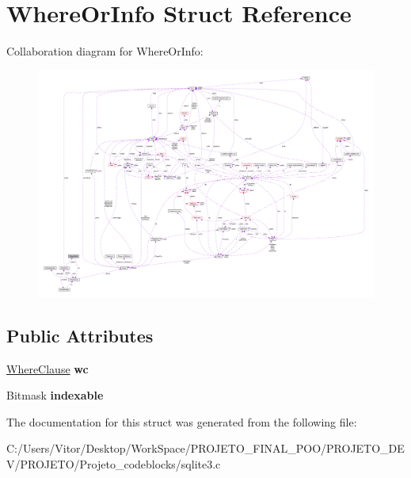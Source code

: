 \hypertarget{struct_where_or_info}{\section{Where\-Or\-Info Struct Reference}
\label{struct_where_or_info}
}


Collaboration diagram for Where\-Or\-Info\-:\nopagebreak
\begin{figure}[H]
\begin{center}
\leavevmode
\includegraphics[width=350pt]{struct_where_or_info__coll__graph}
\end{center}
\end{figure}
\subsection*{Public Attributes}
\begin{DoxyCompactItemize}
\item 
\hypertarget{struct_where_or_info_a45bb04e5ea24ec549f060bc8b210ec71}{\hyperlink{struct_where_clause}{Where\-Clause} {\bfseries wc}}\label{struct_where_or_info_a45bb04e5ea24ec549f060bc8b210ec71}

\item 
\hypertarget{struct_where_or_info_a39777f291e1e516f01b05b71a9805357}{Bitmask {\bfseries indexable}}\label{struct_where_or_info_a39777f291e1e516f01b05b71a9805357}

\end{DoxyCompactItemize}


The documentation for this struct was generated from the following file\-:\begin{DoxyCompactItemize}
\item 
C\-:/\-Users/\-Vitor/\-Desktop/\-Work\-Space/\-P\-R\-O\-J\-E\-T\-O\-\_\-\-F\-I\-N\-A\-L\-\_\-\-P\-O\-O/\-P\-R\-O\-J\-E\-T\-O\-\_\-\-D\-E\-V/\-P\-R\-O\-J\-E\-T\-O/\-Projeto\-\_\-codeblocks/sqlite3.\-c\end{DoxyCompactItemize}

